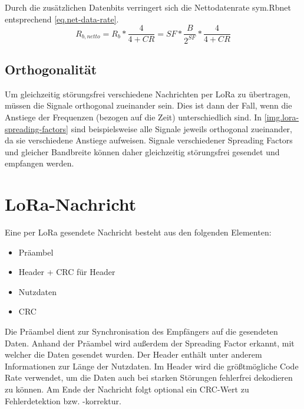 Durch die zusätzlichen Datenbits verringert sich die Nettodatenrate \gls{sym.Rbnet} entsprechend \autoref{eq.net-data-rate}.
\begin{equation}
	R_{b,netto} = R_b * \frac{4}{4 + CR} = SF * \frac{B}{2^{SF}} * \frac{4}{4 + CR}
	\label{eq.net-data-rate}
\end{equation}


\subsection{Orthogonalität}
Um gleichzeitig störungsfrei verschiedene Nachrichten per LoRa zu übertragen, müssen die Signale orthogonal zueinander sein.
Dies ist dann der Fall, wenn die Anstiege der Frequenzen (bezogen auf die Zeit) unterschiedlich sind.
In \autoref{img.lora-spreading-factors} sind beispielsweise alle Signale jeweils orthogonal zueinander, da sie verschiedene Anstiege aufweisen.
Signale verschiedener Spreading Factors und gleicher Bandbreite können daher gleichzeitig störungsfrei gesendet und empfangen werden.
\cite{loraorthogonal}


\section{LoRa-Nachricht}
Eine per LoRa gesendete Nachricht besteht aus den folgenden Elementen:\cite{loralimits}
\begin{itemize}\singlespacing\setlength\itemsep{-0.2em}
\item Präambel
\item Header + \gls{CRC} für Header
\item Nutzdaten
\item \gls{CRC}
\end{itemize}
Die Präambel dient zur Synchronisation des Empfängers auf die gesendeten Daten.
Anhand der Präambel wird außerdem der Spreading Factor erkannt, mit welcher die Daten gesendet wurden.
Der Header enthält unter anderem Informationen zur Länge der Nutzdaten.
Im Header wird die größtmögliche Code Rate verwendet, um die Daten auch bei starken Störungen fehlerfrei dekodieren zu können.
Am Ende der Nachricht folgt optional ein CRC-Wert zu Fehlerdetektion bzw. -korrektur.
